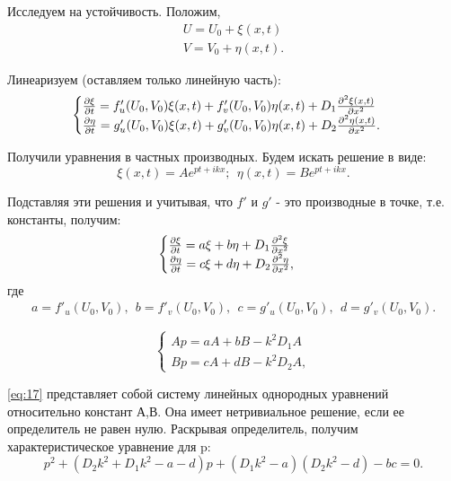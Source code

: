 Исследуем на устойчивость. Положим,
\begin{gather*}
	U=U_0+\xi(x,t) \\
	V=V_0+\eta(x,t).
\end{gather*}

Линеаризуем (оставляем только линейную часть):
\begin{equation}
	\begin{cases}
		\pdv{\xi}{t}=f'_u(U_0, V_0)\xi(x,t)+f'_v(U_0, V_0)\eta(x,t)+D_1 \pdv[2]{\xi(x,t)}{x} \\
		\pdv{\eta}{t}=g'_u(U_0, V_0)\xi(x,t)+g'_v(U_0, V_0)\eta(x,t)+D_2 \pdv[2]{\eta(x,t)}{x}.
	\end{cases}	
	\label{eq:19}
\end{equation}

Получили уравнения в частных производных. Будем искать решение в виде:
\begin{equation}
	\xi(x,t)=A e^{pt+ikx};~~\eta(x,t)=B e^{pt+ikx}.
	\label{eq:20}
\end{equation}

Подставляя эти решения и учитывая, что $f'$ и $g'$ - это производные в точке, т.е. константы, получим:
\begin{equation}
	\begin{cases}
		\pdv{\xi}{t}=a\xi+b\eta+D_1 \pdv[2]{\xi}{x} \\
		\pdv{\eta}{t}=c\xi+d\eta+D_2 \pdv[2]{\eta}{x},
	\end{cases}	
	\label{eq:21}
\end{equation}
где
\begin{gather*}
	a=f'_u(U_0, V_0),~~b=f'_v(U_0, V_0),~~c=g'_u(U_0, V_0),~~d=g'_v(U_0, V_0).
\end{gather*}

\begin{equation}
	\begin{cases}
		Ap=aA+bB-k^2 D_1A \\
		Bp=cA+dB-k^2 D_2A,
	\end{cases}	
	\label{eq:22}
\end{equation}

\eqref{eq:17} представляет собой систему линейных однородных уравнений относительно констант А,В. Она имеет нетривиальное решение, если ее определитель не равен нулю. Раскрывая определитель, получим характеристическое уравнение для p:
\begin{equation}
	p^2+(D_2k^2+D_1k^2-a-d)p+(D_1k^2-a)(D_2k^2-d)-bc=0.
	\label{eq:23}
\end{equation}

